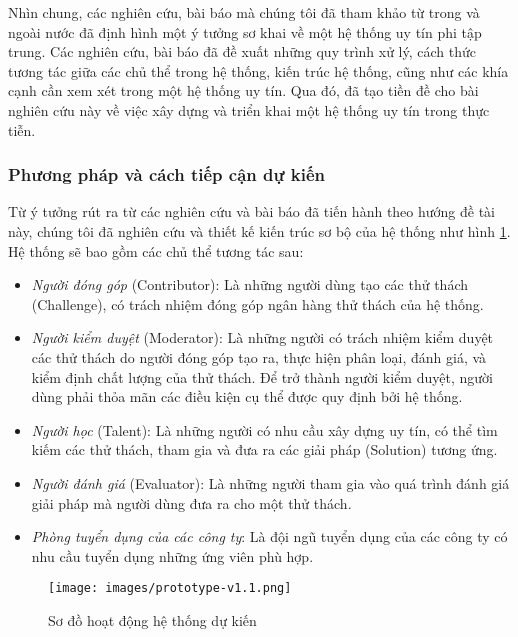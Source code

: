 \par
Nhìn chung, các nghiên cứu, bài báo mà chúng tôi đã tham khảo từ trong và ngoài nước đã định hình một ý tưởng sơ khai về một hệ thống uy tín phi tập trung. Các nghiên cứu, bài báo đã đề xuất những quy trình xử lý, cách thức tương tác giữa các chủ thể trong hệ thống, kiến trúc hệ thống, cũng như các khía cạnh cần xem xét trong một hệ thống uy tín. Qua đó, đã tạo tiền đề cho bài nghiên cứu này về việc xây dựng và triển khai một hệ thống uy tín trong thực tiễn.

\subsubsection{Phương pháp và cách tiếp cận dự kiến}
Từ ý tưởng rút ra từ các nghiên cứu và bài báo đã tiến hành theo hướng đề tài này, chúng tôi đã nghiên cứu và thiết kế kiến trúc sơ bộ của hệ thống như hình \ref{fig:architect}. Hệ thống sẽ bao gồm các chủ thể tương tác sau:
\begin{itemize}
  \item \textit{Người đóng góp} (Contributor): Là những người dùng tạo các thử thách (Challenge), có trách nhiệm đóng góp ngân hàng thử thách của hệ thống.
  \item \textit{Người kiểm duyệt} (Moderator): Là những người có trách nhiệm kiểm duyệt các thử thách do người đóng góp tạo ra, thực hiện phân loại, đánh giá, và kiểm định chất lượng của thử thách. Để trở thành người kiểm duyệt, người dùng phải thỏa mãn các điều kiện cụ thể được quy định bởi hệ thống.
  \item \textit{Người học} (Talent): Là những người có nhu cầu xây dựng uy tín, có thể tìm kiếm các thử thách, tham gia và đưa ra các giải pháp (Solution) tương ứng.
  \item \textit{Người đánh giá} (Evaluator): Là những người tham gia vào quá trình đánh giá giải pháp mà người dùng đưa ra cho một thử thách.
  \item \textit{Phòng tuyển dụng của các công ty}: Là đội ngũ tuyển dụng của các công ty có nhu cầu tuyển dụng những ứng viên phù hợp.
\end{itemize}

\begin{figure} [H]
  \centering
  \texttt{[image: images/prototype-v1.1.png]}
  \caption{Sơ đồ hoạt động hệ thống dự kiến}
  \label{fig:architect}
\end{figure}

